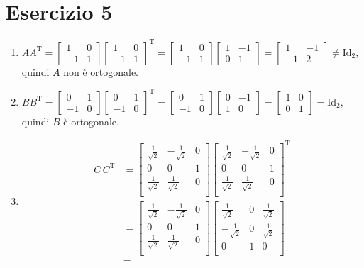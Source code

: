 \documentclass{article}
\newcommand*{\m}[1]{\begin{bmatrix}#1\end{bmatrix}}
\begin{document}
\section*{Esercizio 5}
\begin{enumerate}
    \item $AA^\text{T}=
        \m{ 1 & 0 \\ -1 & 1 }
        \m{ 1 & 0 \\ -1 & 1 }^\text{T} =
        \m{ 1 & 0 \\ -1 & 1 }
        \m{ 1 & -1 \\ 0 & 1 } =
        \m{ 1 & -1 \\ -1 & 2 } \ne \text{Id}_2
    $, quindi $A$ non è ortogonale.
    \item $BB^\text{T}=
        \m{ 0 & 1 \\ -1 & 0 }
        \m{ 0 & 1 \\ -1 & 0 }^\text{T} =
        \m{ 0 & 1 \\ -1 & 0 }
        \m{ 0 & -1 \\ 1 & 0 } =
        \m{ 1 & 0 \\ 0 & 1 } = \text{Id}_2
    $, quindi $B$ è ortogonale.
    \item \begin{equation*}\begin{aligned}
        C\,C^\text{T} &=
        \m{
            \frac{1}{\sqrt{2}} & -\frac{1}{\sqrt{2}} & 0 \\
            0 & 0 & 1 \\
            \frac{1}{\sqrt{2}} & \frac{1}{\sqrt{2}} & 0 \\
        }
        \m{
            \frac{1}{\sqrt{2}} & -\frac{1}{\sqrt{2}} & 0 \\
            0 & 0 & 1 \\
            \frac{1}{\sqrt{2}} & \frac{1}{\sqrt{2}} & 0 \\
        }^\text{T} \\ &=
        \m{
            \frac{1}{\sqrt{2}} & -\frac{1}{\sqrt{2}} & 0 \\
            0 & 0 & 1 \\
            \frac{1}{\sqrt{2}} & \frac{1}{\sqrt{2}} & 0 \\
        }
        \m{
            \frac{1}{\sqrt{2}} & 0 & \frac{1}{\sqrt{2}} \\
            -\frac{1}{\sqrt{2}} & 0 & \frac{1}{\sqrt{2}} \\
            0 & 1 & 0 \\
        } \\ &=

\end{aligned}
\end{equation*}
\end{enumerate}
\end{document}

